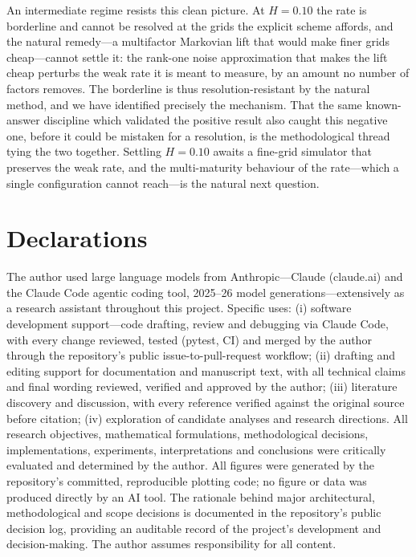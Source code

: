 \documentclass{ws-ijtaf}
\begin{document}
An intermediate regime resists this clean picture. At $H=0.10$ the rate is borderline and
cannot be resolved at the grids the explicit scheme affords, and the natural remedy---a
multifactor Markovian lift that would make finer grids cheap---cannot settle it: the
rank-one noise approximation that makes the lift cheap perturbs the weak rate it is meant to
measure, by an amount no number of factors removes. The borderline is thus resolution-resistant
by the natural method, and we have identified precisely the mechanism. That the same
known-answer discipline which validated the positive result also caught this negative one,
before it could be mistaken for a resolution, is the methodological thread tying the two
together. Settling $H=0.10$ awaits a fine-grid simulator that preserves the weak rate, and the
multi-maturity behaviour of the rate---which a single configuration cannot reach---is the
natural next question.

\section*{Declarations}

The author used large language models from Anthropic---Claude (claude.ai) and the Claude
Code agentic coding tool, 2025--26 model generations---extensively as a research assistant
throughout this project. Specific uses: (i) software development support---code drafting,
review and debugging via Claude Code, with every change reviewed, tested (pytest, CI) and
merged by the author through the repository's public issue-to-pull-request workflow;
(ii) drafting and editing support for documentation and manuscript text, with all technical
claims and final wording reviewed, verified and approved by the author; (iii) literature
discovery and discussion, with every reference verified against the original source before
citation; (iv) exploration of candidate analyses and research directions. All research
objectives, mathematical formulations, methodological decisions, implementations,
experiments, interpretations and conclusions were critically evaluated and determined by
the author. All figures
were generated by the repository's committed, reproducible plotting code; no figure or
data was produced directly by an AI tool. The rationale behind major architectural,
methodological and scope decisions is documented in the repository's public decision log,
providing an auditable record of the project's development and decision-making.
The author assumes responsibility for all content.
\end{document}
